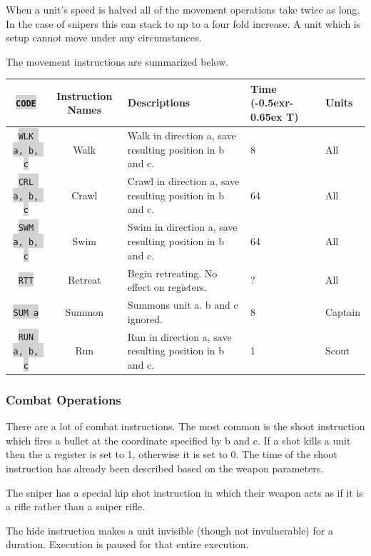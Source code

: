 \documentclass{article}
\newcommand{\vnscode}[1]{\colorbox{lightgray}{\lstinline[language=vns]{#1}}}
\newcommand{\RT}{\lower-0.5ex\hbox{r}\kern-0.65ex T}
\begin{document}
When a unit's speed is halved all of the movement operations take twice as long.
In the case of snipers this can stack to up to a four fold increase. A unit
which is setup cannot move under any circumstances.

The movement instructions are summarized below.

\begin{minipage}{\textwidth}
\label{table:movement}
\centering
\begin{tabular}{|c|c|l|l|l|}
    \hline \vnscode{CODE} & Instruction Names & Descriptions & Time (\RT) & Units \\ \hline
    \vnscode{WLK a, b, c} & Walk & Walk in direction a, save resulting position in b and c. & 8 & All \\ \hline
    \vnscode{CRL a, b, c} & Crawl & Crawl in direction a, save resulting position in b and c. & 64 & All \\ \hline
    \vnscode{SWM a, b, c} & Swim & Swim in direction a, save resulting position in b and c. & 64 & All \\ \hline
    \vnscode{RTT} & Retreat & Begin retreating. No effect on registers. & ? & All \\ \hline
    \vnscode{SUM a} & Summon & Summons unit a. b and c ignored. & 8 & Captain \\ \hline
    \vnscode{RUN a, b, c} & Run & Run in direction a, save resulting position in b and c. & 1 & Scout \\ \hline
\end{tabular}
\end{minipage}

\subsubsection{Combat Operations}

There are a lot of combat instructions. The most common is the shoot instruction
which fires a bullet at the coordinate specified by b and c. If a shot kills a
unit then the a register is set to 1, otherwise it is set to 0. The time of the
shoot instruction has already been described based on the weapon parameters.

The sniper has a special hip shot instruction in which their weapon acts as if
it is a rifle rather than a sniper rifle.

The hide instruction makes a unit invisible (though not invulnerable) for a
duration. Execution is paused for that entire execution.
\end{document}
